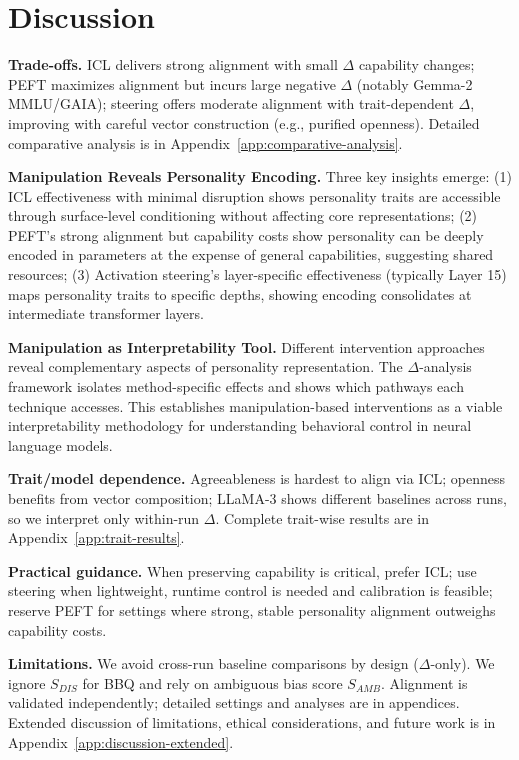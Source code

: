 \section{Discussion}

\textbf{Trade-offs.} ICL delivers strong alignment with small \(\Delta\) capability changes; PEFT maximizes alignment but incurs large negative \(\Delta\) (notably Gemma-2 MMLU/GAIA); steering offers moderate alignment with trait-dependent \(\Delta\), improving with careful vector construction (e.g., purified openness). Detailed comparative analysis is in Appendix~\ref{app:comparative-analysis}.

\textbf{Manipulation Reveals Personality Encoding.} Three key insights emerge: (1) ICL effectiveness with minimal disruption shows personality traits are accessible through surface-level conditioning without affecting core representations; (2) PEFT's strong alignment but capability costs show personality can be deeply encoded in parameters at the expense of general capabilities, suggesting shared resources; (3) Activation steering's layer-specific effectiveness (typically Layer 15) maps personality traits to specific depths, showing encoding consolidates at intermediate transformer layers.

\textbf{Manipulation as Interpretability Tool.} Different intervention approaches reveal complementary aspects of personality representation. The \(\Delta\)-analysis framework isolates method-specific effects and shows which pathways each technique accesses. This establishes manipulation-based interventions as a viable interpretability methodology for understanding behavioral control in neural language models.

\textbf{Trait/model dependence.} Agreeableness is hardest to align via ICL; openness benefits from vector composition; LLaMA-3 shows different baselines across runs, so we interpret only within-run \(\Delta\). Complete trait-wise results are in Appendix~\ref{app:trait-results}.

\textbf{Practical guidance.} When preserving capability is critical, prefer ICL; use steering when lightweight, runtime control is needed and calibration is feasible; reserve PEFT for settings where strong, stable personality alignment outweighs capability costs.

\textbf{Limitations.} We avoid cross-run baseline comparisons by design (\(\Delta\)-only). We ignore \(S_{DIS}\) for BBQ and rely on ambiguous bias score \(S_{AMB}\). Alignment is validated independently; detailed settings and analyses are in appendices. Extended discussion of limitations, ethical considerations, and future work is in Appendix~\ref{app:discussion-extended}.
